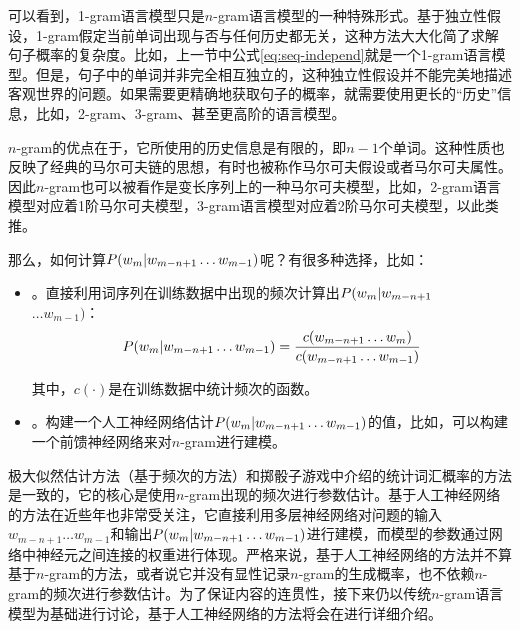 \parinterval 可以看到，1-gram语言模型只是$n$-gram语言模型的一种特殊形式。基于独立性假设，1-gram假定当前单词出现与否与任何历史都无关，这种方法大大化简了求解句子概率的复杂度。比如，上一节中公式\eqref{eq:seq-independ}就是一个1-gram语言模型。但是，句子中的单词并非完全相互独立的，这种独立性假设并不能完美地描述客观世界的问题。如果需要更精确地获取句子的概率，就需要使用更长的“历史”信息，比如，2-gram、3-gram、甚至更高阶的语言模型。

\parinterval $n$-gram的优点在于，它所使用的历史信息是有限的，即$n-1$个单词。这种性质也反映了经典的马尔可夫链的思想，有时也被称作马尔可夫假设或者马尔可夫属性。因此$n$-gram也可以被看作是变长序列上的一种马尔可夫模型，比如，2-gram语言模型对应着1阶马尔可夫模型，3-gram语言模型对应着2阶马尔可夫模型，以此类推。

\parinterval 那么，如何计算${P}(w_m|w_{m-n+1}  \ldots  w_{m-1})$呢？有很多种选择，比如：

\begin{itemize}
\vspace{0.5em}
\item {\small{}}。直接利用词序列在训练数据中出现的频次计算出${P}(w_m|w_{m-n+1}$\\$ \ldots  w_{m-1})$：
\begin{eqnarray}
\funp{P}(w_m|w_{m-n+1} \ldots w_{m-1})=\frac{c(w_{m-n+1} \ldots w_m)}{c(w_{m-n+1} \ldots w_{m-1})}
\label{eq:2-24}
\vspace{0.5em}
\end{eqnarray}

\noindent 其中，$c(\cdot)$是在训练数据中统计频次的函数。

\vspace{0.5em}
\item {\small{}}。构建一个人工神经网络估计${P}(w_m|w_{m-n+1}  \ldots  w_{m-1})$的值，比如，可以构建一个前馈神经网络来对$n$-gram进行建模。
\end{itemize}
\vspace{0.5em}

\parinterval 极大似然估计方法（基于频次的方法）和掷骰子游戏中介绍的统计词汇概率的方法是一致的，它的核心是使用$n$-gram出现的频次进行参数估计。基于人工神经网络的方法在近些年也非常受关注，它直接利用多层神经网络对问题的输入$w_{m-n+1} \ldots w_{m-1}$和输出${P}(w_m|w_{m-n+1}  \ldots  w_{m-1})$进行建模，而模型的参数通过网络中神经元之间连接的权重进行体现。严格来说，基于人工神经网络的方法并不算基于$n$-gram的方法，或者说它并没有显性记录$n$-gram的生成概率，也不依赖$n$-gram的频次进行参数估计。为了保证内容的连贯性，接下来仍以传统$n$-gram语言模型为基础进行讨论，基于人工神经网络的方法将会在{\chapternine}进行详细介绍。

